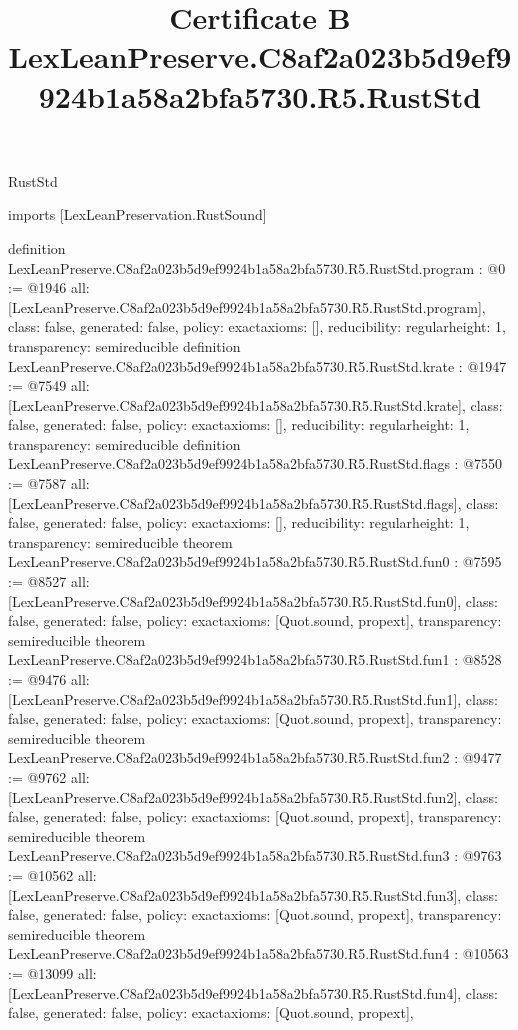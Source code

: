 \begin{lexlean}{RustStd}
\title{Certificate B LexLeanPreserve.C8af2a023b5d9ef9924b1a58a2bfa5730.R5.RustStd}
\begin{coremodule}
imports [LexLeanPreservation.RustSound]

definition LexLeanPreserve.C8af2a023b5d9ef9924b1a58a2bfa5730.R5.RustStd.program : @0 := @1946 {
  all: [LexLeanPreserve.C8af2a023b5d9ef9924b1a58a2bfa5730.R5.RustStd.program],
  class: false,
  generated: false,
  policy: exact{axioms: []},
  reducibility: regular{height: 1},
  transparency: semireducible
}
definition LexLeanPreserve.C8af2a023b5d9ef9924b1a58a2bfa5730.R5.RustStd.krate : @1947 := @7549 {
  all: [LexLeanPreserve.C8af2a023b5d9ef9924b1a58a2bfa5730.R5.RustStd.krate],
  class: false,
  generated: false,
  policy: exact{axioms: []},
  reducibility: regular{height: 1},
  transparency: semireducible
}
definition LexLeanPreserve.C8af2a023b5d9ef9924b1a58a2bfa5730.R5.RustStd.flags : @7550 := @7587 {
  all: [LexLeanPreserve.C8af2a023b5d9ef9924b1a58a2bfa5730.R5.RustStd.flags],
  class: false,
  generated: false,
  policy: exact{axioms: []},
  reducibility: regular{height: 1},
  transparency: semireducible
}
theorem LexLeanPreserve.C8af2a023b5d9ef9924b1a58a2bfa5730.R5.RustStd.fun0 : @7595 := @8527 {
  all: [LexLeanPreserve.C8af2a023b5d9ef9924b1a58a2bfa5730.R5.RustStd.fun0],
  class: false,
  generated: false,
  policy: exact{axioms: [Quot.sound, propext]},
  transparency: semireducible
}
theorem LexLeanPreserve.C8af2a023b5d9ef9924b1a58a2bfa5730.R5.RustStd.fun1 : @8528 := @9476 {
  all: [LexLeanPreserve.C8af2a023b5d9ef9924b1a58a2bfa5730.R5.RustStd.fun1],
  class: false,
  generated: false,
  policy: exact{axioms: [Quot.sound, propext]},
  transparency: semireducible
}
theorem LexLeanPreserve.C8af2a023b5d9ef9924b1a58a2bfa5730.R5.RustStd.fun2 : @9477 := @9762 {
  all: [LexLeanPreserve.C8af2a023b5d9ef9924b1a58a2bfa5730.R5.RustStd.fun2],
  class: false,
  generated: false,
  policy: exact{axioms: [Quot.sound, propext]},
  transparency: semireducible
}
theorem LexLeanPreserve.C8af2a023b5d9ef9924b1a58a2bfa5730.R5.RustStd.fun3 : @9763 := @10562 {
  all: [LexLeanPreserve.C8af2a023b5d9ef9924b1a58a2bfa5730.R5.RustStd.fun3],
  class: false,
  generated: false,
  policy: exact{axioms: [Quot.sound, propext]},
  transparency: semireducible
}
theorem LexLeanPreserve.C8af2a023b5d9ef9924b1a58a2bfa5730.R5.RustStd.fun4 : @10563 := @13099 {
  all: [LexLeanPreserve.C8af2a023b5d9ef9924b1a58a2bfa5730.R5.RustStd.fun4],
  class: false,
  generated: false,
  policy: exact{axioms: [Quot.sound, propext]},
}
\end{coremodule}
\end{lexlean}
